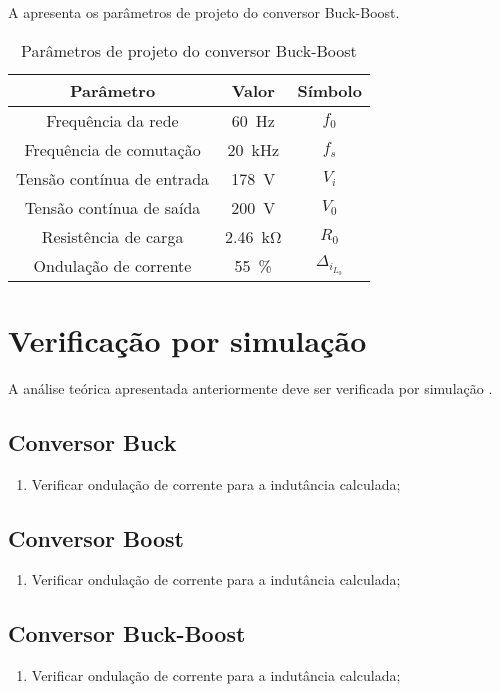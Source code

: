 A  apresenta os parâmetros de projeto do conversor Buck-Boost.
\begin{table}[!ht]
	\centering
	\caption{Parâmetros de projeto do conversor Buck-Boost}
	\label{tab:parametrosBuckBoost}
	\begin{tabular}{@{}ccc@{}}
		\toprule
		\textbf{Parâmetro} & \textbf{Valor} & \textbf{Símbolo} \\ \midrule			
		Frequência  da rede        & \SI{60}{\hertz}     & $f_0$  \\		
		Frequência de comutação        & \SI{20}{\kilo\hertz}     & $f_s$  \\	
		Tensão contínua de entrada         &  \SI{178}{\V}      & $V_i$  \\
		Tensão contínua de saída         &  \SI{200}{\V}      & $V_0$  \\
		Resistência de carga        & \SI{2.46}{\kilo\ohm}      & $R_0$  \\
		Ondulação de corrente       & \SI{55}{\%}    & $\Delta_{i_{L_0}}$    \\  \bottomrule	
	\end{tabular}
\end{table}

\section{Verificação por simulação}


A análise teórica apresentada anteriormente deve ser verificada por simulação \cite{noauthor_psim_nodate}. 
 
\subsection{Conversor Buck}
\begin{enumerate}	
	\item Verificar ondulação de corrente para a indutância calculada; 	
\end{enumerate}

\subsection{Conversor Boost}
\begin{enumerate}	
	\item Verificar ondulação de corrente para a indutância calculada; 	
\end{enumerate}

\subsection{Conversor Buck-Boost}
\begin{enumerate}	
	\item Verificar ondulação de corrente para a indutância calculada; 	
\end{enumerate}



